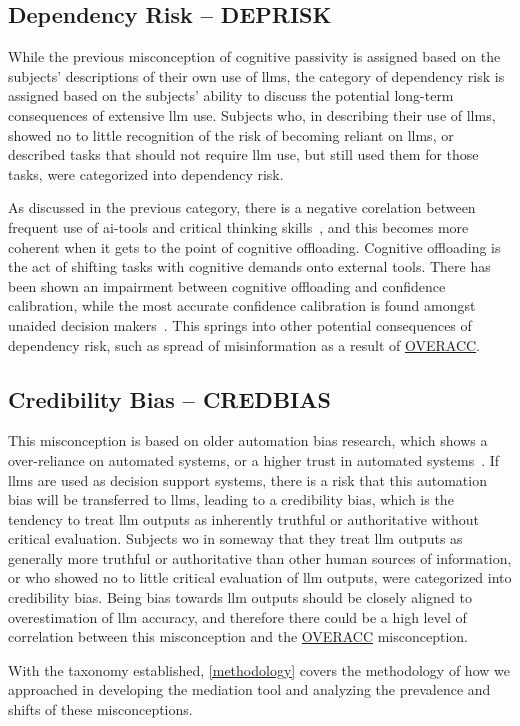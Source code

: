 \subsection{Dependency Risk -- DEPRISK}\label{deprisk}
While the previous misconception of cognitive passivity is assigned based on the subjects' descriptions of their own use of \gls{llms}, the category of dependency risk is assigned based on the subjects' ability to discuss the potential long-term consequences of extensive \gls{llm} use. Subjects who, in describing their use of \gls{llms}, showed no to little recognition of the risk of becoming reliant on \gls{llms}, or described tasks that should not require \gls{llm} use, but still used them for those tasks, were categorized into dependency risk.

As discussed in the previous category, there is a negative corelation between frequent use of \gls{ai}-tools and critical thinking skills~\cite{gerlich_ai_2025}, and this becomes more coherent when it gets to the point of cognitive offloading. Cognitive offloading is the act of shifting tasks with cognitive demands onto external tools. There has been shown an impairment between cognitive offloading and confidence calibration, while the most accurate confidence calibration is found amongst unaided decision makers~\cite{cheatle_accurate_2026}. This springs into other potential consequences of dependency risk, such as spread of misinformation as a result of \hyperref[overacc]{OVERACC}.

\subsection{Credibility Bias -- CREDBIAS}\label{credbias}
This misconception is based on older automation bias research, which shows a over-reliance on automated systems, or a higher trust in automated systems~\cite{goddard_automation_2012}. If \gls{llms} are used as decision support systems, there is a risk that this automation bias will be transferred to \gls{llms}, leading to a credibility bias, which is the tendency to treat \gls{llm} outputs as inherently truthful or authoritative without critical evaluation. Subjects wo in someway that they treat \gls{llm} outputs as generally more truthful or authoritative than other human sources of information, or who showed no to little critical evaluation of \gls{llm} outputs, were categorized into credibility bias. Being bias towards \gls{llm} outputs should be closely aligned to overestimation of \gls{llm} accuracy, and therefore there could be a high level of correlation between this misconception and the \hyperref[overacc]{OVERACC} misconception.

With the taxonomy established, \autoref{methodology} covers the methodology of how we approached in developing the mediation tool and analyzing the prevalence and shifts of these misconceptions.